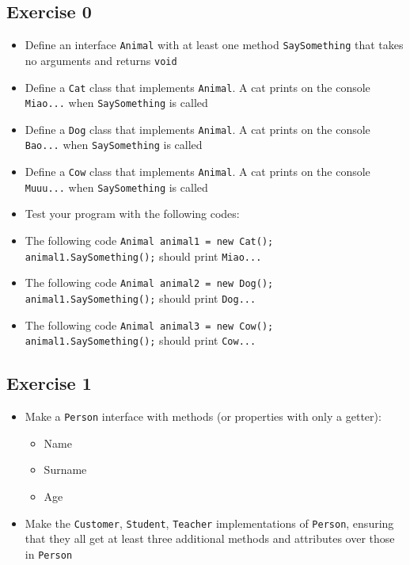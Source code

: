 		\subsection{Exercise 0}
		\begin{myprop}
	    \begin{itemize}
	    	\item Define an interface \texttt{Animal} with at least one method \texttt{SaySomething} that takes no arguments and returns \texttt{void}
	    	\item Define a \texttt{Cat} class that implements \texttt{Animal}. A cat prints on the console \texttt{Miao...} when \texttt{SaySomething} is called
	    	\item Define a \texttt{Dog} class that implements \texttt{Animal}. A cat prints on the console \texttt{Bao...} when \texttt{SaySomething} is called
	    	\item Define a \texttt{Cow} class that implements \texttt{Animal}. A cat prints on the console \texttt{Muuu...} when \texttt{SaySomething} is called
	    	\item[] Test your program with the following codes:
	    	\item The following code \texttt{Animal animal1 = new Cat(); animal1.SaySomething();} should print \texttt{Miao...}
	    	\item The following code \texttt{Animal animal2 = new Dog(); animal1.SaySomething();} should print \texttt{Dog...}
	    	\item The following code \texttt{Animal animal3 = new Cow(); animal1.SaySomething();} should print \texttt{Cow...}
	    \end{itemize}
	    \end{myprop}
	    
    	\subsection{Exercise 1}
    	\begin{itemize}
    		\item Make a \texttt{Person} interface with methods (or properties with only a getter):
    		\begin{itemize}
    			\item Name
    			\item Surname
    			\item Age
    		\end{itemize}
    		
    		\item Make the \texttt{Customer}, \texttt{Student}, \texttt{Teacher} implementations of \texttt{Person}, ensuring that they all get at least three additional methods and attributes over those in \texttt{Person}
    	\end{itemize}
    	
